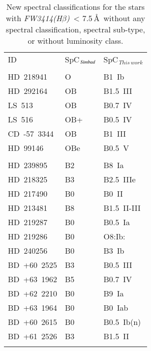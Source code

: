 \documentclass{aa}
\newcommand{\fwhb}{\textit{FW3414(H$\beta$)}}
\begin{document}
\begin{appendix}
\begin{table}[h]
\caption{New spectral classifications for the stars with \fwhb\ < 7.5\,\AA\ without any spectral classification, spectral sub-type, or without luminosity class.}
\label{tab:newclass_noLC}
    \centering
    \begin{tabular}{lll}
        ID & SpC$_{\textit{\,Simbad}}$ & SpC$_{\,This\,work}$ \\
        \noalign{\vspace{0.2cm}}\hline\noalign{\smallskip}
        \multicolumn{3}{c}{Stars without full spectral classification}\\
        \noalign{\smallskip}\hline\noalign{\smallskip\smallskip}\smallskip
        HD~218941    & O   & B1~Ib   \\\smallskip
        HD~292164    & OB  & B1.5~III \\\smallskip
        LS~513       & OB  & B0.7~IV \\\smallskip
        LS~516       & OB+ & B0.5~IV \\\smallskip
        CD~-57~3344  & OB  & B1~III  \\\smallskip
        HD~99146     & OBe & B0.5~V  \\
        \noalign{\smallskip}\hline\noalign{\smallskip}
        \multicolumn{3}{c}{Stars without luminosity class}\\
        \noalign{\smallskip}\hline\noalign{\smallskip\smallskip}\smallskip
        HD~239895    & B2 & B8~Ia \\\smallskip
        HD~218325    & B3 & B2.5~IIIe \\\smallskip
        HD~217490    & B0 & B0~II \\\smallskip
        HD~213481    & B8 & B1.5~II-III \\\smallskip
        HD~219287    & B0 & B0.5~Ia \\\smallskip
        HD~219286    & B0 & O8:Ib: \\\smallskip
        HD~240256    & B0 & B3~Ib \\\smallskip
        BD~+60~2525  & B3 & B0.5~III \\\smallskip
        BD~+63~1962  & B5 & B0.7~IV \\\smallskip
        BD~+62~2210  & B0 & B9~Ia \\\smallskip
        BD~+63~1964  & B0 & B0~Iab \\\smallskip
        BD~+60~2615  & B0 & B0.5~Ib(n) \\\smallskip
        BD~+61~2526  & B3 & B1.5~II \\\smallskip

\end{tabular}
\end{table}
\end{appendix}
\end{document}
